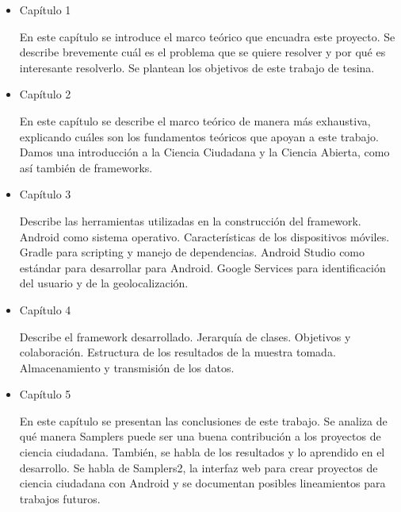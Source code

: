 \begin{itemize} 
	\item{Capítulo 1} 
		\begin{description} En este capítulo se introduce el marco teórico que encuadra este proyecto. Se describe brevemente cuál es el problema que se quiere resolver y por qué es interesante resolverlo. Se plantean los objetivos de este trabajo de tesina.
		\end{description}

	\item{Capítulo 2} 
		\begin{description} En este capítulo se describe el marco teórico de manera más exhaustiva, explicando cuáles son los fundamentos teóricos que apoyan a este trabajo. Damos una introducción a la Ciencia Ciudadana y la Ciencia Abierta, como así también de frameworks.
		\end{description}
	
	\item{Capítulo 3} 
		\begin{description} Describe las herramientas utilizadas en la construcción del framework. Android como sistema operativo. Características de los dispositivos móviles. Gradle para scripting y manejo de dependencias. Android Studio como estándar para desarrollar para Android. Google Services para identificación del usuario y de la geolocalización. 
		\end{description}
	
	\item{Capítulo 4} 
		\begin{description} Describe el framework desarrollado. Jerarquía de clases. Objetivos y colaboración. Estructura de los resultados de la muestra tomada. Almacenamiento y transmisión de los datos.
		\end{description}

	\item{Capítulo 5} 
		\begin{description} En este capítulo se presentan las conclusiones de este trabajo. Se analiza de qué manera Samplers puede ser una buena contribución a los proyectos de ciencia ciudadana. También, se habla de los resultados y lo aprendido en el desarrollo. Se habla de Samplers2, la interfaz web para crear proyectos de ciencia ciudadana con Android y se documentan posibles lineamientos para trabajos futuros.
		\end{description}
\end{itemize}

